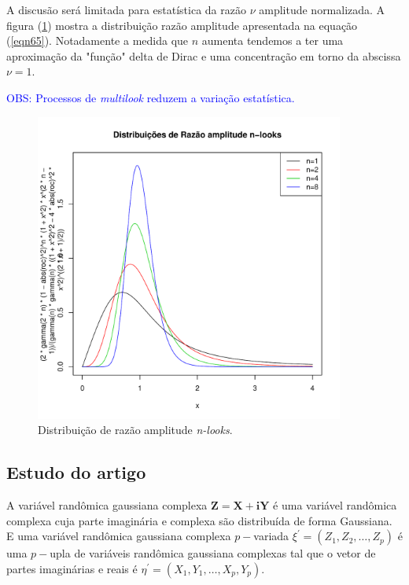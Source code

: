 \documentclass[12pt,a4paper]{article}
\begin{document}
A discusão será limitada para estatística da razão $\nu$ amplitude normalizada. A figura (\ref{fig2}) mostra a distribuição razão amplitude apresentada na equação  (\ref{eqn65}). Notadamente a medida que $n$ aumenta tendemos a ter uma aproximação da "função" delta de Dirac e uma concentração em torno da abscissa $\nu=1$.

\textcolor{blue}{OBS: Processos de {\it multilook} reduzem a variação estatística.}

\begin{figure}[hbt]
\centering
\includegraphics[width=4.0in]{fig4_eq_33_lee_1994.pdf}
	\caption{Distribuição de razão amplitude {\it n-looks}.}
\label{fig2}
\end{figure}


\subsection{Estudo do artigo  \cite{goodman1963}}


A variável randômica gaussiana complexa $\mathbf{Z=X+iY}$ é uma variável randômica complexa cuja parte imaginária e complexa são distribuída de forma Gaussiana.  E uma variável randômica gaussiana complexa $p-$variada $\xi^{'}=(Z_1,Z_2,\dots,Z_p)$ é uma $p-$upla  de variáveis randômica gaussiana complexas tal que o vetor de partes imaginárias e reais é $\eta^{'}=(X_1,Y_1,\dots,X_p,Y_p)$.
\end{document}
